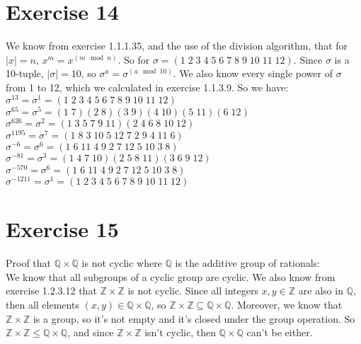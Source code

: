\documentclass[12pt]{article}
\newcommand{\Z}{\mathbb{Z}}
\newcommand{\Q}{\mathbb{Q}}
\begin{document}
    \section*{Exercise 14}
    We know from exercise 1.1.1.35, and the use of the division
    algorithm, that for $|x| = n$, $x^m = x^{(m \mod n)}$.
    So for $\sigma = (1\;2\;3\;4\;5\;6\;7\;8\;9\;10\;11\;12)$.
    Since $\sigma$ is a 10-tuple, $|\sigma| = 10$,
    so $\sigma^a = \sigma^{(a \mod 10)}$.
    We also know every single power of $\sigma$ from 1 to 12,
    which we calculated in exercise 1.1.3.9.
    So we have: \\
    $\sigma^{13} = \sigma^1 = (1\;2\;3\;4\;5\;6\;7\;8\;9\;10\;11\;12)$ \\
    $\sigma^{65} = \sigma^5 = (1\;7)(2\;8)(3\;9)(4\;10)(5\;11)(6\;12)$ \\
    $\sigma^{626} = \sigma^2 = (1\;3\;5\;7\;9\;11)(2\;4\;6\;8\;10\;12)$ \\
    $\sigma^{1195} = \sigma^7 = (1\;8\;3\;10\;5\;12\;7\;2\;9\;4\;11\;6)$ \\
    $\sigma^{-6} = \sigma^6 = (1\;6\;11\;4\;9\;2\;7\;12\;5\;10\;3\;8)$ \\
    $\sigma^{-81} = \sigma^3 = (1\;4\;7\;10)(2\;5\;8\;11)(3\;6\;9\;12)$ \\
    $\sigma^{-570} = \sigma^6 = (1\;6\;11\;4\;9\;2\;7\;12\;5\;10\;3\;8)$ \\
    $\sigma^{-1211} = \sigma^1 = (1\;2\;3\;4\;5\;6\;7\;8\;9\;10\;11\;12)$


    \section*{Exercise 15}
    Proof that $\Q \times \Q$ is not cyclic
    where $\Q$ is the additive group of rationals: \\
    We know that all subgroups of a cyclic group are cyclic.
    We also know from exercise 1.2.3.12 that $\Z \times \Z$
    is not cyclic.
    Since all integers $x, y \in \Z$ are also in $\Q$,
    then all elements $(x, y) \in \Q \times \Q$,
    so $\Z \times \Z \subseteq \Q \times \Q$.
    Moreover, we know that $\Z \times \Z$ is a group,
    so it's not empty and it's closed under the group operation.
    So $\Z \times \Z \leqslant \Q \times \Q$,
    and since $\Z \times \Z$ isn't cyclic,
    then $\Q \times \Q$ can't be either.
\end{document}
